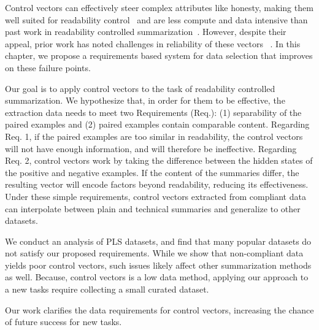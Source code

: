 

Control vectors can effectively steer complex attributes like honesty, making them well suited for readability control~\cite{zou2025representationengineeringtopdownapproach, rimsky-etal-2024-steering} and are less compute and data intensive than past work in readability controlled summarization~\cite{ribeiro-etal-2023-generating}. %
However, despite their appeal, prior work has noted challenges in reliability of these vectors ~\parencite{vonrutte2024languagemodelsguidelatent, stickland2024steeringeffectsimprovingpostdeployment, 10.5555/3737916.3742333, braun2025understandingunreliabilitysteeringvectors}. In this chapter, we propose a requirements based system for data selection that improves on these failure points.



Our goal is to apply control vectors to the task of readability controlled summarization. We hypothesize that, in order for them to be effective, the extraction data needs to meet two Requirements (Req.): (1) separability of the paired examples and (2) paired examples contain comparable content. Regarding Req. 1, if the paired examples are too similar in readability, the control vectors will not have enough information, and will therefore be ineffective. Regarding Req. 2, control vectors work by taking the difference between the hidden states of the positive and negative examples. If the content of the summaries differ, the resulting vector will encode factors beyond readability, reducing its effectiveness. 
Under these simple requirements, control vectors extracted from compliant data can interpolate between plain and technical summaries and generalize to other datasets.

We conduct an analysis of PLS datasets, and find that many popular datasets do not satisfy our proposed requirements. While we show that non-compliant data yields poor control vectors, such issues likely affect other summarization methods as well. Because, control vectors is a low data method, applying our approach to a new tasks require collecting a small curated dataset.

Our work clarifies the data requirements for control vectors, increasing the chance of future success for new tasks. 